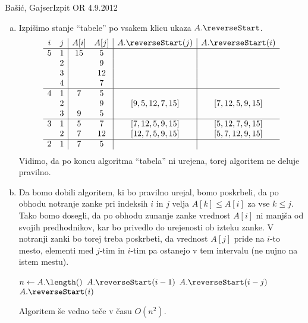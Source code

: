 \begin{naloga}{Bašić, Gajser}{Izpit OR 4.9.2012}
\begin{odgovor}
\begin{enumerate}[(a)]
\item Izpišimo stanje ``tabele'' po vsakem klicu ukaza $A.\reverseStart$.
$$
\begin{array}{cc|cc|c|c}
i & j & A[i] & A[j] & A.\reverseStart(j) & A.\reverseStart(i) \\ \hline
5 & 1 & 15 &  5 && \\
  & 2 &    &  9 && \\
  & 3 &    & 12 && \\
  & 4 &    &  7 && \\ \hline
4 & 1 &  7 &  5 && \\
  & 2 &    &  9 & [9, 5, 12, 7, 15] & [7, 12, 5, 9, 15] \\
  & 3 &  9 &  5 && \\ \hline
3 & 1 &  5 &  7 & [7, 12, 5, 9, 15] & [5, 12, 7, 9, 15] \\
  & 2 &  7 & 12 & [12, 7, 5, 9, 15] & [5, 7, 12, 9, 15] \\ \hline
2 & 1 &  7 &  5 &&
\end{array}
$$
Vidimo, da po koncu algoritma ``tabela'' ni urejena,
torej algoritem ne deluje pravilno.

\item Da bomo dobili algoritem, ki bo pravilno urejal, bomo poskrbeli,
da po obhodu notranje zanke pri indeksih $i$ in $j$
velja $A[k] \le A[i]$ za vse $k \le j$.
Tako bomo dosegli,
da po obhodu zunanje zanke vrednost $A[i]$ ni manjša od svojih predhodnikov,
kar bo privedlo do urejenosti ob izteku zanke.
V notranji zanki bo torej treba poskrbeti,
da vrednost $A[j]$ pride na $i$-to mesto,
elementi med $j$-tim in $i$-tim pa ostanejo v tem intervalu
(ne nujno na istem mestu).
\begin{small}
\begin{algorithmic}
\State $n \gets A.\length()$
            \State $A.\reverseStart(i-1)$
            \State $A.\reverseStart(i-j)$
            \State $A.\reverseStart(i)$
        \EndIf
    \EndFor
\EndFor
\end{algorithmic}
\end{small}
Algoritem še vedno teče v času $O(n^2)$.


\end{enumerate}
\end{odgovor}
\end{naloga}
